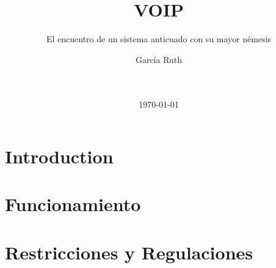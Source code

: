 \documentclass{acm_proc_article-sp}
\begin{document}
\title{VOIP}
\subtitle{El encuentro de un sistema anticuado con su mayor némesis}

\author{
  \alignauthor
  García Ruth\\
  \\
  \\
}
\date{\today}

\maketitle
\begin{abstract}

\end{abstract}


\section{Introduction}


\section{Funcionamiento}


\section{Restricciones y Regulaciones}

%

%
%

\balancecolumns
\end{document}
